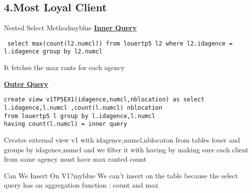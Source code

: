 \subsection*{4.Most Loyal Client}


\begin{prettyBox}{Nested Select Method}{myblue}
\textbf{\underline{Inner Query}}
\begin{lstlisting}
 select max(count(l2.numcl)) from louertp5 l2 where l2.idagence = l.idagence group by l2.numcl
\end{lstlisting}
It fetches the max rants for each agency

\vspace{0.25cm}
\textbf{\underline{Outer Query}}
\begin{lstlisting}
create view v1TP5EX1(idagence,numcl,nblocation) as select l.idagence,l.numcl ,count(l.numcl) nblocation 
from louertp5 l group by l.idagence,l.numcl
having count(l.numcl) = inner query 
\end{lstlisting}
Creates external view v1 with idagence,numcl,nblocaton from tables louer and groups by idagence,numcl
and we filter it with having by making sure each client from same agency must have max ranted count
\end{prettyBox}

\vspace{0.25cm}
\begin{prettyBox}{Can We Insert On V1?}{myblue}
We can't insert on the table because the select query has an aggregation function : count and max
\end{prettyBox}
